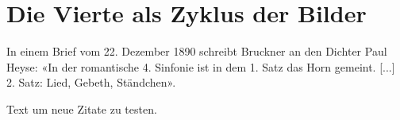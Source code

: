 \section{Die Vierte als Zyklus der Bilder}

In einem Brief vom 22. Dezember 1890 schreibt Bruckner an den Dichter Paul Heyse: «In der romantische 4. Sinfonie ist in dem 1. Satz das Horn gemeint. [...] 2. Satz: Lied, Gebeth, Ständchen».\autocite{heinze:bruckner}

Text um neue\autocite{roeder:bruckner} Zitate\autocite{heinze:bruckner} zu testen.
